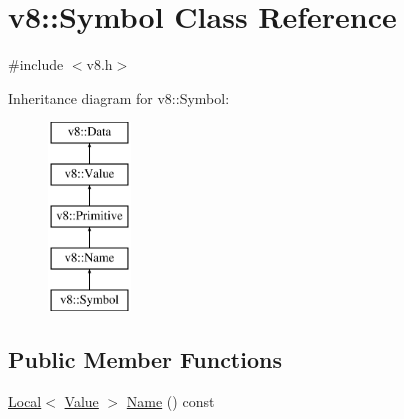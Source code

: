 \hypertarget{classv8_1_1Symbol}{}\section{v8\+:\+:Symbol Class Reference}
\label{classv8_1_1Symbol}


{\ttfamily \#include $<$v8.\+h$>$}

Inheritance diagram for v8\+:\+:Symbol\+:\begin{figure}[H]
\begin{center}
\leavevmode
\includegraphics[height=5.000000cm]{classv8_1_1Symbol}
\end{center}
\end{figure}
\subsection*{Public Member Functions}
\begin{DoxyCompactItemize}
\item 
\mbox{\hyperlink{classv8_1_1Local}{Local}}$<$ \mbox{\hyperlink{classv8_1_1Value}{Value}} $>$ \mbox{\hyperlink{classv8_1_1Symbol_a8b6346ed4f396a1286fc50a95d84b79c}{Name}} () const
\end{DoxyCompactItemize}
